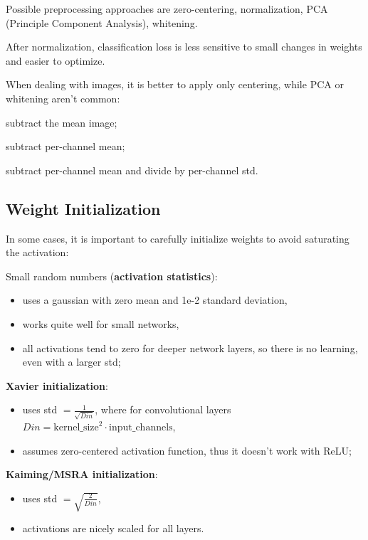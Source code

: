 Possible preprocessing approaches are zero-centering, normalization, PCA (Principle Component Analysis), whitening.

After normalization, classification loss is less sensitive to small changes in weights and easier to optimize.

When dealing with images, it is better to apply only centering, while PCA or whitening aren't common:
\begin{myitem}
    \item subtract the mean image;
    \item subtract per-channel mean;
    \item subtract per-channel mean and divide by per-channel std.
\end{myitem}


\subsection{Weight Initialization}\label{sec:tnn-weights}

In some cases, it is important to carefully initialize weights to avoid saturating the activation:
\begin{myitem}
    \item Small random numbers (\textbf{activation statistics}):
    \begin{itemize}
        \item uses a gaussian with zero mean and 1e-2 standard deviation,
        \item works quite well for small networks,
        \item all activations tend to zero for deeper network layers, so there is no learning, even with a larger std;
    \end{itemize}
    \item \textbf{Xavier initialization}:
    \begin{itemize}
        \item uses std $= \frac{1}{\sqrt{Din}}$, where for convolutional layers $Din = \text{kernel\_size}^2 \cdot \text{input\_channels}$,
        \item assumes zero-centered activation function, thus it doesn't work with ReLU;
    \end{itemize}
    \item \textbf{Kaiming/MSRA initialization}:
    \begin{itemize}
        \item uses std $= \sqrt{\frac{2}{Din}}$,
        \item activations are nicely scaled for all layers.
    \end{itemize}
\end{myitem}

